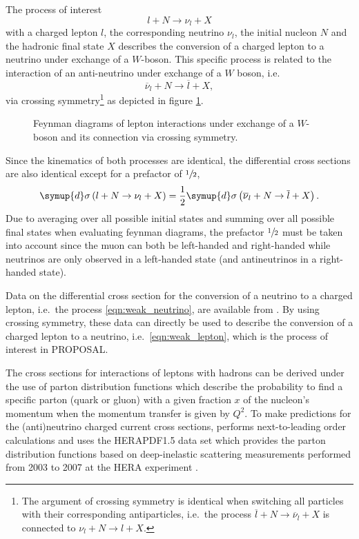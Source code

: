 The process of interest
%
\begin{equation}
    \label{eqn:weak_lepton}
    l + N \rightarrow \nu_l + X
\end{equation}
%
with a charged lepton $l$, the corresponding neutrino $\nu_l$, the initial nucleon $N$ and the hadronic final state $X$ describes the conversion of a charged lepton to a neutrino under exchange of a $W$-boson.
This specific process is related to the interaction of an anti-neutrino under exchange of a $W$ boson, i.e.\
%
\begin{equation}
    \label{eqn:weak_neutrino}
    \overline{\nu}_l + N \rightarrow \overline{l} + X,
\end{equation}
%
via crossing symmetry\footnote{The argument of crossing symmetry is identical when switching all particles with their corresponding antiparticles, i.e.\ the process $\overline{l} + N \rightarrow \overline{\nu}_l + X$ is connected to $\nu_l + N \rightarrow l + X$.} as depicted in figure \ref{fig:feynman_weak}.
%
\begin{figure}
    \centering
    
    \caption{Feynman diagrams of lepton interactions under exchange of a $W$-boson and its connection via crossing symmetry.}
    \label{fig:feynman_weak}
\end{figure}
%
Since the kinematics of both processes are identical, the differential cross sections are also identical except for a prefactor of $\sfrac{1}{2}$,
%
\begin{equation}
    \symup{d}\sigma\left( l + N \rightarrow \nu_l + X \right) = \frac{1}{2} \symup{d}\sigma\left( \overline{\nu}_l + N \rightarrow \overline{l} + X \right).
\end{equation}
%
Due to averaging over all possible initial states and summing over all possible final states when evaluating feynman diagrams, the prefactor $\sfrac{1}{2}$ must be taken into account since the muon can both be left-handed and right-handed while neutrinos are only observed in a left-handed state (and antineutrinos in a right-handed state).

Data on the differential cross section for the conversion of a neutrino to a charged lepton, i.e.\ the process \eqref{eqn:weak_neutrino}, are available from \cite{Cooper_Sarkar_2011}.
By using crossing symmetry, these data can directly be used to describe the conversion of a charged lepton to a neutrino, i.e.\ \eqref{eqn:weak_lepton}, which is the process of interest in PROPOSAL.

The cross sections for interactions of leptons with hadrons can be derived under the use of parton distribution functions which describe the probability to find a specific parton (quark or gluon) with a given fraction $x$ of the nucleon's momentum when the momentum transfer is given by $Q^2$.
To make predictions for the (anti)neutrino charged current cross sections, \cite{Cooper_Sarkar_2011} performs next-to-leading order calculations and uses the HERAPDF1.5 data set which provides the parton distribution functions based on deep-inelastic scattering measurements performed from 2003 to 2007 at the HERA experiment \cite{am2010proton}.

